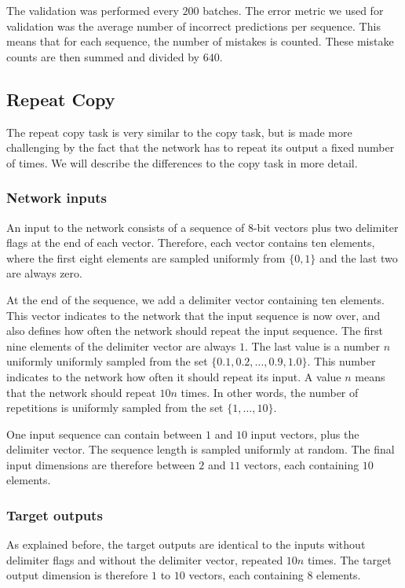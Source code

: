 \documentclass[12pt,twoside]{article}
\theoremstyle{plain}
\theoremstyle{definition}
\theoremstyle{remark}
\begin{document}
The validation was performed every $200$ batches. The error metric we used for validation was the average number of incorrect predictions per sequence. This means that for each sequence, the number of mistakes is counted. These mistake counts are then summed and divided by $640$.

\subsection{Repeat Copy}
The repeat copy task is very similar to the copy task, but is made more challenging by the fact that the network has to repeat its output a fixed number of times. We will describe the differences to the copy task in more detail.

\subsubsection{Network inputs}
An input to the network consists of a sequence of 8-bit vectors plus two delimiter flags at the end of each vector. Therefore, each vector contains ten elements, where the first eight elements are sampled uniformly from $\{0,1\}$ and the last two are always zero.

At the end of the sequence, we add a delimiter vector containing ten elements. This vector indicates to the network that the input sequence is now over, and also defines how often the network should repeat the input sequence. The first nine elements of the delimiter vector are always $1$. The last value is a number $n$ uniformly uniformly sampled from the set $\{0.1, 0.2, \ldots, 0.9, 1.0\}$. This number indicates to the network how often it should repeat its input. A value $n$ means that the network should repeat $10n$ times. In other words, the number of repetitions is uniformly sampled from the set $\{1, \ldots, 10\}$.

One input sequence can contain between $1$ and $10$ input vectors, plus the delimiter vector. The sequence length is sampled uniformly at random. The final input dimensions are therefore between $2$ and $11$ vectors, each containing $10$ elements.

\subsubsection{Target outputs}
As explained before, the target outputs are identical to the inputs without delimiter flags and without the delimiter vector, repeated $10n$ times. The target output dimension is therefore $1$ to $10$ vectors, each containing $8$ elements.
\end{document}
